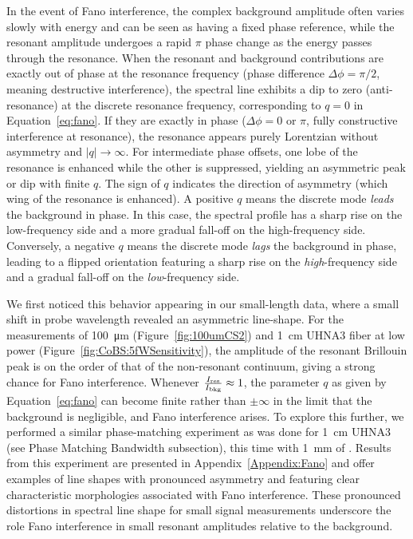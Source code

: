 In the event of Fano interference, the complex background amplitude often varies slowly with energy and can be seen as having a fixed phase reference, while the resonant amplitude undergoes a rapid \(\pi\) phase change as the energy passes through the resonance. \cite{limonov2017fano} When the resonant and background contributions are exactly out of phase at the resonance frequency (phase difference \(\Delta\phi = \pi/2\), meaning destructive interference), the spectral line exhibits a dip to zero (anti-resonance) at the discrete resonance frequency, corresponding to \(q=0\) in Equation~\ref{eq:fano}. If they are exactly in phase (\(\Delta\phi = 0\) or \(\pi\), fully constructive interference at resonance), the resonance appears purely Lorentzian without asymmetry and \(|q| \to \infty\). For intermediate phase offsets, one lobe of the resonance is enhanced while the other is suppressed, yielding an asymmetric peak or dip with finite \(q\). The sign of \(q\) indicates the direction of asymmetry (which wing of the resonance is enhanced). A positive \(q\) means the discrete mode \textit{leads} the background in phase. In this case, the spectral profile has a sharp rise on the low-frequency side and a more gradual fall-off on the high-frequency side. Conversely, a negative \(q\) means the discrete mode \textit{lags} the background in phase, leading to a flipped orientation featuring a sharp rise on the \textit{high}-frequency side and a gradual fall-off on the \textit{low}-frequency side.

We first noticed this behavior appearing in our small-length  data, where a small shift in probe wavelength revealed an asymmetric line-shape. For the measurements of \SI{100}{\micro\meter}  (Figure~\ref{fig:100umCS2}) and \SI{1}{\centi\meter} \ac{UHNA3} fiber at low power (Figure~\ref{fig:CoBS:5fWSensitivity}), the amplitude of the resonant Brillouin peak is on the order of that of the non‐resonant continuum, giving a strong chance for Fano interference. Whenever \(\tfrac{I_{\rm res}}{I_{\rm bkg}}\approx 1\), the parameter \(q\) as given by Equation~\ref{eq:fano} can become finite rather than \(\pm \infty\) in the limit that the background is negligible, and Fano interference arises. To explore this further, we performed a similar phase-matching experiment as was done for \SI{1}{\centi\meter} \ac{UHNA3} (see Phase Matching Bandwidth subsection), this time with \SI{1}{\milli\meter} of . Results from this experiment are presented in Appendix~\ref{Appendix:Fano} and offer examples of line shapes with pronounced asymmetry and featuring clear characteristic morphologies associated with Fano interference. These pronounced distortions in spectral line shape for small signal measurements underscore the role Fano interference in small resonant amplitudes relative to the background.

